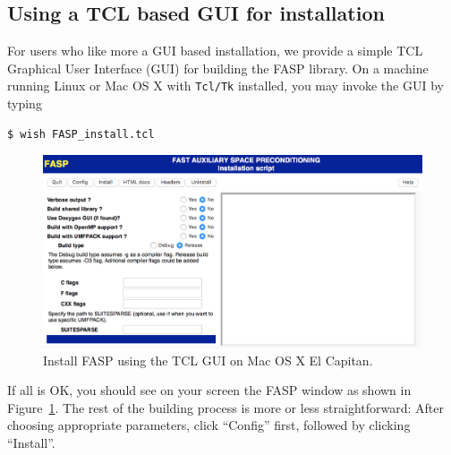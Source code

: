 \documentclass[11pt]{memoir}
\begin{document}
\subsection{Using a TCL based GUI for installation}
For users who like more a GUI based installation, we provide a simple
TCL Graphical User
Interface (GUI) for building the FASP library. On a machine running
Linux or Mac OS X with \verb|Tcl/Tk| installed, you may invoke the GUI
by typing
%
\begin{lstlisting}[numbers=none]
$ wish FASP_install.tcl
\end{lstlisting}
%
\begin{figure}[h!!] %
   \centering
   \includegraphics[width=\linewidth]{fig/install-fasp-gui.png} 
   \caption{Install FASP using the TCL GUI on Mac OS X El Capitan.}
   \label{fig:gui}
\end{figure}
%
If all is OK, you should see on your screen the FASP window as shown
in Figure~\ref{fig:gui}. The rest of the building process is more or
less straightforward: After choosing appropriate parameters, click
``Config'' first, followed by clicking ``Install''.
\end{document}
